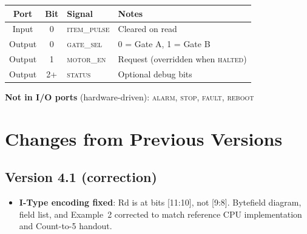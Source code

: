 \documentclass[11pt,a4paper]{article}
\newcommand{\signal}[1]{\textsc{#1}}
\begin{document}
\begin{table}[H]
\centering
\begin{tabular}{@{}cclp{6cm}@{}}
\toprule
\textbf{Port} & \textbf{Bit} & \textbf{Signal} & \textbf{Notes} \\
\midrule
Input  & 0  & \signal{item\_pulse} & Cleared on read \\
Output & 0  & \signal{gate\_sel}   & 0 = Gate A, 1 = Gate B \\
Output & 1  & \signal{motor\_en}   & Request (overridden when \signal{halted}) \\
Output & 2+ & \signal{status}      & Optional debug bits \\
\bottomrule
\end{tabular}
\end{table}

\textbf{Not in I/O ports} (hardware-driven): \signal{alarm}, \signal{stop}, \signal{fault}, \signal{reboot}

\section{Changes from Previous Versions}

\subsection*{Version 4.1 (correction)}
\begin{itemize}[nosep]
  \item \textbf{I-Type encoding fixed}: Rd is at bits [11:10], not [9:8]. Bytefield diagram, field list, and Example~2 corrected to match reference CPU implementation and Count-to-5 handout.
\end{itemize}
\end{document}
